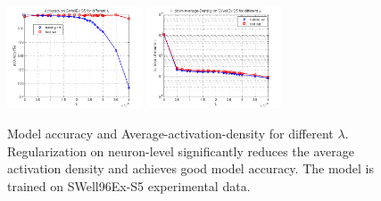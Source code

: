 \begin{figure}
\includegraphics[width=4cm,height=3cm]{figure/Accuracy_on_SWellEx_S5_for_different_lambda}
\includegraphics[width=4cm,height=3cm]{figure/Hidden_Average_Density_on_SWellEx_S5_for_different_lambda}
\caption{Model accuracy and Average-activation-density for different $\lambda $. Regularization on neuron-level
significantly reduces the average activation density and achieves good model accuracy. The model is trained on SWell96Ex-S5 experimental data.}
\end{figure}


